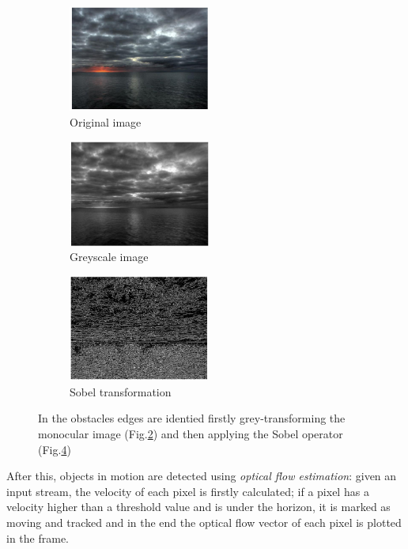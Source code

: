 \documentclass[12pt]{article}
\begin{document}
            \begin{figure}
                  \centering

                  \begin{subfigure}[b]{.30\linewidth}
                  \includegraphics[width=\linewidth, height= 3.5cm]{./Images/Azzabi/original}
                  \caption{Original image}\label{fig:original}
                  \end{subfigure}
                  \begin{subfigure}[b]{.30\linewidth}
                  \includegraphics[width=\linewidth, height= 3.5cm]{./Images/Azzabi/greyscale}
                  \caption{Greyscale image}\label{fig:greyscale}
                  \end{subfigure}
                  \begin{subfigure}[b]{.30\linewidth}
                  \includegraphics[width=\linewidth, height= 3.5cm]{./Images/Azzabi/sobel}
                  \caption{Sobel transformation}\label{fig:sobel}
                  \end{subfigure}

                  \caption{In \parencite{Azzabi} the obstacles edges are identied firstly grey-transforming the monocular image (Fig.\ref{fig:greyscale}) and then applying the Sobel operator (Fig.\ref{fig:sobel})}
            \end{figure}
      \indent After this, objects in motion are detected using \textit{optical flow estimation}: given an input stream, the velocity of each pixel is firstly calculated; if a pixel has a velocity higher than a threshold value and is under the horizon, it is marked as moving and tracked and in the end the optical flow vector of each pixel is plotted in the frame.\\
\end{document}
